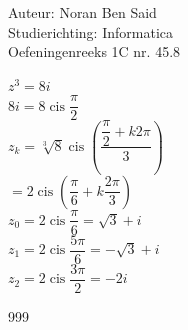 \documentclass[a4paper]{article}
\begin{document}
\noindent \large Auteur: Noran Ben Said \\
\noindent \large Studierichting: Informatica\\
\noindent \large Oefeningenreeks 1C nr. 45.8 \\

\medskip
\normalsize

$z^3 = 8i$\\

$8i = 8 \operatorname{ cis } \dfrac{\pi}{2}$\\

$z_k = \sqrt[3]{8} \operatorname{ cis } \left( \dfrac{\dfrac{\pi}{2} + k2\pi}{3} \right)$\\

$= 2 \operatorname{ cis } \left( \dfrac{\pi}{6} + k \dfrac{2\pi}{3} \right)$\\

$z_0 = 2 \operatorname{ cis } \dfrac{\pi}{6} = \sqrt{3} + i$\\

$z_1 = 2 \operatorname{ cis } \dfrac{5\pi}{6} = -\sqrt{3} + i$\\

$z_2 = 2 \operatorname{ cis } \dfrac{3\pi}{2} = -2i$\\


\begin{thebibliography}{999}
\end{thebibliography}
\end{document}

